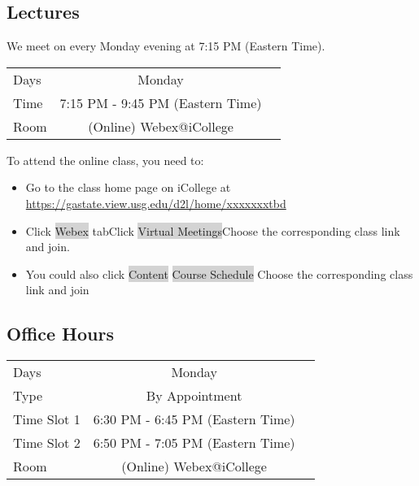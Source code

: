 \documentclass[a4paper, 12pt]{article}
\begin{document}
\subsection{Lectures}
We meet on every Monday evening at 7:15 PM (Eastern Time).
\begin{center}
  \begin{tabular}{ l | c r }
    \hline			
    Days & Monday\\
   Time & 7:15 PM - 9:45 PM (Eastern Time) \\
    Room & (Online) Webex@iCollege\\
    \hline  
  \end{tabular}
\end{center}
\begin{flushleft}
To attend the online class, you need to:
\begin{itemize}
  \item Go to the class home page on iCollege at \url{https://gastate.view.usg.edu/d2l/home/xxxxxxxtbd}
  \item Click \colorbox{lightgray}{Webex} tab\textrightarrow Click \colorbox{lightgray}{Virtual Meetings}\textrightarrow Choose the corresponding class link and join.
  \item You could also click \colorbox{lightgray}{Content} \colorbox{lightgray}{Course Schedule} \textrightarrow Choose the corresponding class link and join
\end{itemize}
\end{flushleft}

\subsection{Office Hours}
\begin{center}
  \begin{tabular}{ l | c r }
    \hline			
    Days & Monday\\
    Type & By Appointment\\
    Time Slot 1 & 6:30 PM - 6:45 PM (Eastern Time) \\
    Time Slot 2 & 6:50 PM - 7:05 PM (Eastern Time) \\
    Room & (Online) Webex@iCollege\\
    \hline  
  \end{tabular}
\end{center}
\end{document}
